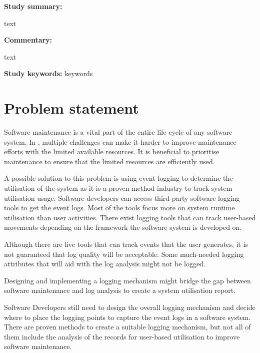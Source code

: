 \clearpage

\begin{tcolorbox}[colback=gray!5!white, colframe=deepblue!80!black, title=On the Relationship between Software Complexity and Maintenance Costs\cite{Ogheneovo2014}]
	\begin{minipage}[t]{0.25\textwidth}
		\textbf{Study summary:}
	\end{minipage}
	\hfill
	\begin{minipage}[t]{0.65\textwidth}
		text
	\end{minipage}

	\vspace{0.75em} 

	\begin{minipage}[t]{0.25\textwidth}
		\textbf{Commentary:}
	\end{minipage}
	\hfill
	\begin{minipage}[t]{0.65\textwidth}
		text
	\end{minipage}
	\tcblower
	\textbf{Study keywords:} keywords
\end{tcolorbox}



\section{Problem statement}\label{sec:ch1_problemStatement}
Software maintenance is a vital part of the entire life cycle of any software system. In , multiple challenges can make it harder to improve maintenance efforts with the limited available resources. It is beneficial to prioritise maintenance to ensure that the limited resources are efficiently used. \par A possible solution to this problem is using event logging to determine the utilisation of the system as it is a proven method industry to track system utilisation usage. Software developers can access third-party software logging tools to get the event logs. Most of the tools focus more on system runtime utilisation than user activities. There exist logging tools that can track user-based movements depending on the framework the software system is developed on.\par Although there are live tools that can track events that the user generates, it is not guaranteed that log quality will be acceptable. Some much-needed logging attributes that will aid with the log analysis might not be logged.\par Designing and implementing a logging mechanism might bridge the gap between software maintenance and log analysis to create a system utilisation report.\par Software Developers still need to design the overall logging mechanism and decide where to place the logging points to capture the event logs in a software system. There are proven methods to create a suitable logging mechanism, but not all of them include the analysis of the records for user-based utilisation to improve software maintenance.

